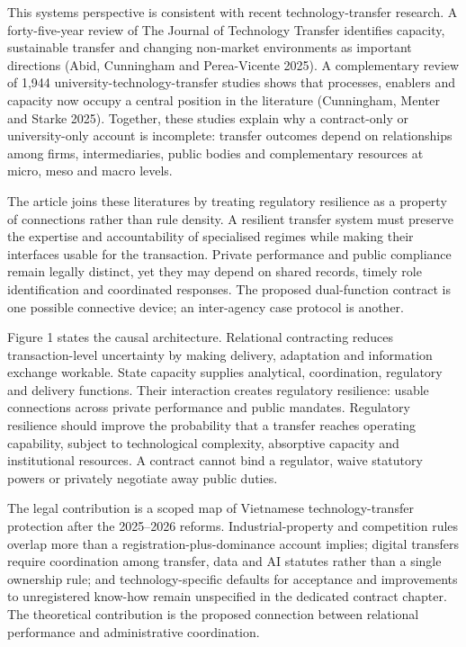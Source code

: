 \documentclass[
]{article}
\begin{document}
This systems perspective is consistent with recent technology-transfer
research. A forty-five-year review of The Journal of Technology Transfer
identifies capacity, sustainable transfer and changing non-market
environments as important directions (Abid, Cunningham and Perea-Vicente
2025). A complementary review of 1,944 university-technology-transfer
studies shows that processes, enablers and capacity now occupy a central
position in the literature (Cunningham, Menter and Starke 2025).
Together, these studies explain why a contract-only or university-only
account is incomplete: transfer outcomes depend on relationships among
firms, intermediaries, public bodies and complementary resources at
micro, meso and macro levels.

The article joins these literatures by treating regulatory resilience as
a property of connections rather than rule density. A resilient transfer
system must preserve the expertise and accountability of specialised
regimes while making their interfaces usable for the transaction.
Private performance and public compliance remain legally distinct, yet
they may depend on shared records, timely role identification and
coordinated responses. The proposed dual-function contract is one
possible connective device; an inter-agency case protocol is another.

Figure 1 states the causal architecture. Relational contracting reduces
transaction-level uncertainty by making delivery, adaptation and
information exchange workable. State capacity supplies analytical,
coordination, regulatory and delivery functions. Their interaction
creates regulatory resilience: usable connections across private
performance and public mandates. Regulatory resilience should improve
the probability that a transfer reaches operating capability, subject to
technological complexity, absorptive capacity and institutional
resources. A contract cannot bind a regulator, waive statutory powers or
privately negotiate away public duties.

The legal contribution is a scoped map of Vietnamese technology-transfer
protection after the 2025--2026 reforms. Industrial-property and
competition rules overlap more than a registration-plus-dominance
account implies; digital transfers require coordination among transfer,
data and AI statutes rather than a single ownership rule; and
technology-specific defaults for acceptance and improvements to
unregistered know-how remain unspecified in the dedicated contract
chapter. The theoretical contribution is the proposed connection between
relational performance and administrative coordination.
\end{document}
